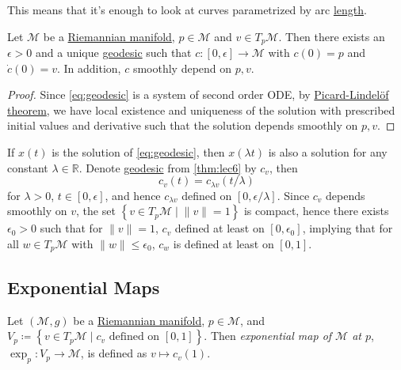 This means that it's enough to look at curves parametrized by arc \hyperref[def:length]{length}.

\begin{theorem}\label{thm:lec6}
	Let \(\mathcal{M} \) be a \hyperref[def:Riemannian-manifold]{Riemannian manifold}, \(p\in \mathcal{M} \) and \(v\in T_p \mathcal{M} \). Then there exists an \(\epsilon > 0\) and a unique \hyperref[def:geodesic]{geodesic} such that \(c\colon [0, \epsilon ] \to  \mathcal{M} \) with \(c(0) = p\) and \(\dot{c}(0) = v\). In addition, \(c\) smoothly depend on \(p, v\).
\end{theorem}
\begin{proof}
	Since \autoref{eq:geodesic} is a system of second order ODE, by \href{https://en.wikipedia.org/wiki/Picard%E2%80%93Lindel%C3%B6f_theorem}{Picard-Lindelöf theorem}, we have local existence and uniqueness of the solution with prescribed initial values and derivative such that the solution depends smoothly on \(p, v\).
\end{proof}

\begin{remark}
	If \(x(t)\) is the solution of \autoref{eq:geodesic}, then \(x(\lambda t)\) is also a solution for any constant \(\lambda \in \mathbb{R} \). Denote \hyperref[def:geodesic]{geodesic} from \autoref{thm:lec6} by \(c_v\), then
	\[
		c_v(t) = c_{\lambda v}(t / \lambda )
	\]
	for \(\lambda > 0\), \(t\in [0, \epsilon ]\), and hence \(c_{\lambda v}\) defined on \([0, \epsilon / \lambda ]\). Since \(c_v\) depends smoothly on \(v\), the set \(\left\{ v\in T_p \mathcal{M} \mid \lVert v \rVert = 1 \right\} \) is compact, hence there exists \(\epsilon _0 > 0\) such that for \(\lVert v \rVert = 1\), \(c_v\) defined at least on \([0, \epsilon _0]\), implying that for all \(w\in T_p \mathcal{M} \) with \(\lVert w \rVert \leq \epsilon _0\), \(c_w\) is defined at least on \([0, 1]\).
\end{remark}

\subsection{Exponential Maps}

\begin{definition}\label{def:exponential-map}
	Let \((\mathcal{M} , g)\) be a \hyperref[def:Riemannian-manifold]{Riemannian manifold}, \(p\in \mathcal{M} \), and \(V_p \coloneqq \left\{ v\in T_p \mathcal{M} \mid c_v \text{ defined on } [0, 1] \right\}\). Then \emph{exponential map of \(\mathcal{M} \) at \(p\)}, \(\exp_p \colon V_p \to \mathcal{M} \), is defined as \(v \mapsto c_v(1)\).
\end{definition}

